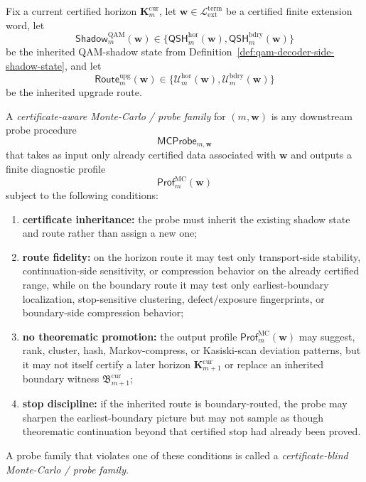\begin{definition}
\label{def:certificate-aware-monte-carlo-probe-family}
Fix a current certified horizon \(\mathbf K_m^{\mathrm{cur}}\), let \(\mathbf w\in \mathcal L_{\mathrm{ext}}^{\mathrm{term}}\) be a certified finite extension word, let
\[
  \mathsf{Shadow}^{\mathrm{QAM}}_{m}(\mathbf w)
  \in
  \{\mathsf{QSH}^{\mathrm{hor}}_{m}(\mathbf w),\mathsf{QSH}^{\mathrm{bdry}}_{m}(\mathbf w)\}
\]
be the inherited QAM-shadow state from Definition~\ref{def:qam-decoder-side-shadow-state}, and let
\[
  \mathsf{Route}^{\mathrm{upg}}_{m}(\mathbf w)
  \in
  \{\mathcal U^{\mathrm{hor}}_{m}(\mathbf w),\mathcal U^{\mathrm{bdry}}_{m}(\mathbf w)\}
\]
be the inherited upgrade route.

A \emph{certificate-aware Monte-Carlo / probe family} for \((m,\mathbf w)\) is any downstream probe procedure
\[
  \mathsf{MCProbe}_{m,\mathbf w}
\]
that takes as input only already certified data associated with \(\mathbf w\) and outputs a finite diagnostic profile
\[
  \mathsf{Prof}^{\mathrm{MC}}_{m}(\mathbf w)
\]
subject to the following conditions:
\begin{enumerate}[label=(\roman*)]
  \item \textbf{certificate inheritance:} the probe must inherit the existing shadow state and route rather than assign a new one;
  \item \textbf{route fidelity:} on the horizon route it may test only transport-side stability, continuation-side sensitivity, or compression behavior on the already certified range, while on the boundary route it may test only earliest-boundary localization, stop-sensitive clustering, defect/exposure fingerprints, or boundary-side compression behavior;
  \item \textbf{no theorematic promotion:} the output profile \(\mathsf{Prof}^{\mathrm{MC}}_{m}(\mathbf w)\) may suggest, rank, cluster, hash, Markov-compress, or Kasiski-scan deviation patterns, but it may not itself certify a later horizon \(\mathbf K_{m+1}^{\mathrm{cur}}\) or replace an inherited boundary witness \(\mathfrak B_{m+1}^{\mathrm{cur}}\);
  \item \textbf{stop discipline:} if the inherited route is boundary-routed, the probe may sharpen the earliest-boundary picture but may not sample as though theorematic continuation beyond that certified stop had already been proved.
\end{enumerate}
A probe family that violates one of these conditions is called a \emph{certificate-blind Monte-Carlo / probe family}.
\end{definition}

